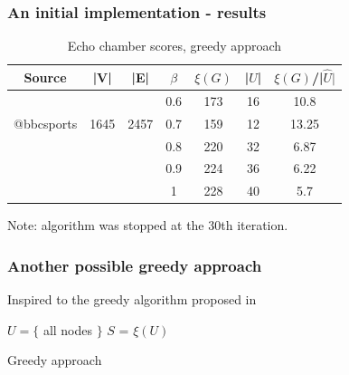 \documentclass{beamer}
\begin{document}
\begin{frame}[c]
    \frametitle{An initial implementation - results}
    \begin{table}[htpb]
        \centering
        \caption{Echo chamber scores, greedy approach}
        \begin{tabular}{c|c|c|c|c|c|c}
            \textbf{Source} & {|V|} & {|E|} & $\beta $ & {$\xi(G)$} &
            {|$\hat{U}$|} & $\xi(G)$/{|$\hat{U}|$} \\
            \hline
            \multirow{3}{*}{@bbcsports} & \multirow{3}{*}{1645} &
            \multirow{3}{*}{2457} & 0.6 & 173 & 16 & 10.8 \\
                                  &  & & 0.7 & 159 & 12 & 13.25 \\
                                  &  & & 0.8 & 220 & 32 & 6.87 \\
                                  &  & & 0.9 & 224 & 36 & 6.22 \\
                                  &  & & 1 & 228 & 40 & 5.7 \\
        \end{tabular}
    \end{table}

    Note: algorithm was stopped at the 30th iteration.
\end{frame}

\begin{frame}[c]
    \frametitle{Another possible greedy approach}
    Inspired to the greedy algorithm proposed in
    \cite{10.1007/3-540-44436-X_10}

    \begin{algorithm}[H]
        \SetAlgoLined
        $U = \{$ all nodes $\}$\;
        $S$ = $\xi(U)$ \;
        \caption{Greedy approach}
    \end{algorithm}

\end{frame}

%
%
%
%
%
%
\end{document}
